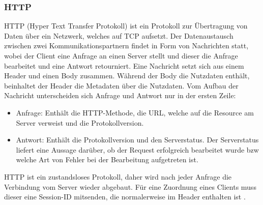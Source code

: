 \subsubsection{HTTP}
\label{sec:HTTP}
HTTP (Hyper Text Transfer Protokoll) ist ein Protokoll zur Übertragung von Daten über ein Netzwerk, 
welches auf TCP aufsetzt.
Der Datenaustausch zwischen zwei Kommunikationspartnern findet in Form von Nachrichten statt, 
wobei der Client eine Anfrage an einen Server stellt und dieser die Anfrage bearbeitet und eine Antwort retourniert.
%
Eine Nachricht setzt sich aus einem Header und einen Body zusammen.
Während der Body die Nutzdaten enthält, beinhaltet der Header die Metadaten über die Nutzdaten.
Vom Aufbau der Nachricht unterscheiden sich Anfrage und Antwort nur in der ersten Zeile:
\begin{itemize}
	\item Anfrage: Enthält die HTTP-Methode, die URL, welche auf die Resource am Server verweist und die Protokollversion.
	\item Antwort: Enthält die Protokollversion und den Serverstatus. 
		Der Serverstatus liefert eine Aussage darüber, 
		ob der Request erfolgreich bearbeitet wurde bzw welche Art von Fehler bei der Bearbeitung aufgetreten ist.
\end{itemize}
HTTP ist ein zustandsloses Protokoll, daher wird nach jeder Anfrage die Verbindung vom Server wieder abgebaut.
Für eine Zuordnung eines Clients muss dieser eine Session-ID mitsenden, die normalerweise im Header enthalten ist \cite{http}.

